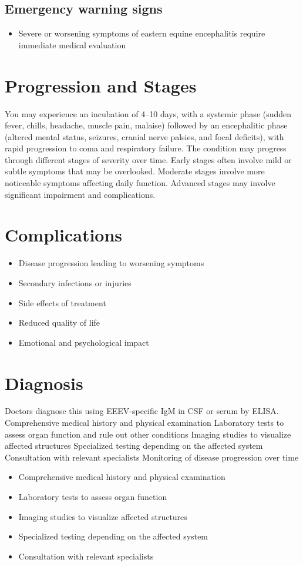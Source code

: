 \subsection{Emergency warning signs}
\begin{itemize}[noitemsep]
  \item Severe or worsening symptoms of eastern equine encephalitis require immediate medical evaluation
\end{itemize}
\section{Progression and Stages}
You may experience an incubation of 4--10 days, with a systemic phase (sudden fever, chills, headache, muscle pain, malaise) followed by an encephalitic phase (altered mental status, seizures, cranial nerve palsies, and focal deficits), with rapid progression to coma and respiratory failure. The condition may progress through different stages of severity over time. Early stages often involve mild or subtle symptoms that may be overlooked. Moderate stages involve more noticeable symptoms affecting daily function. Advanced stages may involve significant impairment and complications.
\section{Complications}
\begin{itemize}[noitemsep]
  \item Disease progression leading to worsening symptoms
  \item Secondary infections or injuries
  \item Side effects of treatment
  \item Reduced quality of life
  \item Emotional and psychological impact
\end{itemize}
\section{Diagnosis}
Doctors diagnose this using EEEV-specific IgM in CSF or serum by ELISA. Comprehensive medical history and physical examination Laboratory tests to assess organ function and rule out other conditions Imaging studies to visualize affected structures Specialized testing depending on the affected system Consultation with relevant specialists Monitoring of disease progression over time

\begin{itemize}[noitemsep]
  \item Comprehensive medical history and physical examination
  \item Laboratory tests to assess organ function
  \item Imaging studies to visualize affected structures
  \item Specialized testing depending on the affected system
  \item Consultation with relevant specialists
\end{itemize}

